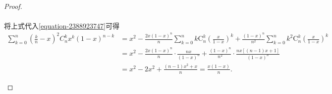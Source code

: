 \documentclass[../../main.tex]{subfiles}%
\begin{document}
\begin{proof}
\begin{enumerate}
\begin{gather*}
\end{gather*}
将上式代入\eqref{equation-2388923747}可得
\begin{align*}
\sum_{k=0}^n{\left( \frac{k}{n}-x \right) ^2C_{n}^{k}x^k\left( 1-x \right) ^{n-k}}&=x^2-\frac{2x\left( 1-x \right) ^n}{n}\sum_{k=0}^n{k\mathrm{C}_{n}^{k}\left( \frac{x}{1-x} \right) ^k}+\frac{\left( 1-x \right) ^n}{n^2}\sum_{k=0}^n{k^2\mathrm{C}_{n}^{k}\left( \frac{x}{1-x} \right) ^k}
\\
&=x^2-\frac{2x\left( 1-x \right) ^n}{n}\cdot \frac{nx}{\left( 1-x \right) ^n}+\frac{\left( 1-x \right) ^n}{n^2}\cdot \frac{nx\left[ \left( n-1 \right) x+1 \right]}{\left( 1-x \right) ^n}
\\
&=x^2-2x^2+\frac{\left( n-1 \right) x^2+x}{n}=\frac{x\left( 1-x \right)}{n}.
\end{align*}
\end{enumerate}

\end{proof}
\end{document}
